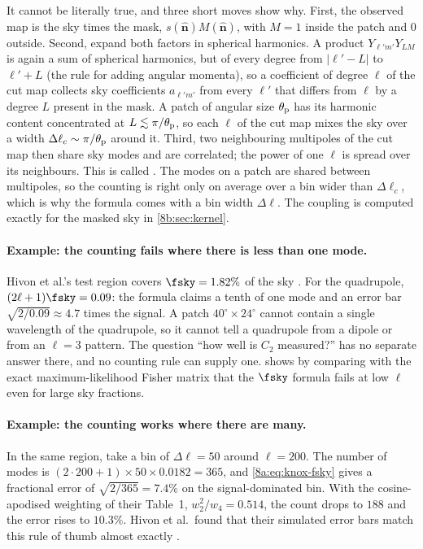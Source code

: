 It cannot be literally true, and three short moves show why. First, the observed map is the
sky times the mask, $s(\hat{\bm n})M(\hat{\bm n})$, with $M=1$ inside the patch and $0$ outside.
Second, expand both factors in spherical harmonics. A product $Y_{\ell'm'}Y_{LM}$ is again a sum
of spherical harmonics, but of every degree from $|\ell'-L|$ to $\ell'+L$ (the rule for adding
angular momenta), so a coefficient of degree $\ell$ of the cut map collects sky coefficients
$a_{\ell'm'}$ from every $\ell'$ that differs from $\ell$ by a degree $L$ present in the mask. A
patch of angular size $\theta_{\rm p}$ has its harmonic content concentrated at
$L\lesssim\pi/\theta_{\rm p}$, so each $\ell$ of the cut map mixes the sky over a width
$\Delta\ell_c\sim\pi/\theta_{\rm p}$ around it. Third, two neighbouring multipoles of the cut map
then share sky modes and are correlated; the power of one $\ell$ is spread over its neighbours.
This is called  . The modes on a patch are shared between
multipoles, so the counting is right only on average over a bin wider than $\Delta\ell_c$, which
is why the formula comes with a bin width $\Delta\ell$. The coupling is computed exactly for the
masked sky in \cref{8b:sec:kernel}.

\paragraph{Example: the counting fails where there is less than one mode.}
Hivon et al.'s test region covers $\fsky=1.82\%$ of the sky . For the
quadrupole, $(2\ell+1)\fsky=0.09$: the formula claims a tenth of one mode and an error bar
$\sqrt{2/0.09}\approx4.7$ times the signal. A patch $40^\circ\times24^\circ$ cannot contain a
single wavelength of the quadrupole, so it cannot tell a quadrupole from a dipole or from an
$\ell=3$ pattern. The question ``how well is $C_2$ measured?'' has no separate answer there, and
no counting rule can supply one. \Textcite{Efstathiou2004} shows by comparing with the exact
maximum-likelihood Fisher matrix that the $\fsky$ formula fails at low $\ell$ even for large
sky fractions.

\paragraph{Example: the counting works where there are many.}
In the same region, take a bin of $\Delta\ell=50$ around $\ell=200$. The number of modes is
$(2\cdot200+1)\times50\times0.0182=365$, and \eqref{8a:eq:knox-fsky} gives a fractional error
of $\sqrt{2/365}=7.4\%$ on the signal-dominated bin. With the cosine-apodised weighting of
their Table~1, $w_2^2/w_4=0.514$, the count drops to $188$ and the error rises to $10.3\%$.
Hivon et al.\ found that their simulated error bars match this rule of thumb almost exactly
.

